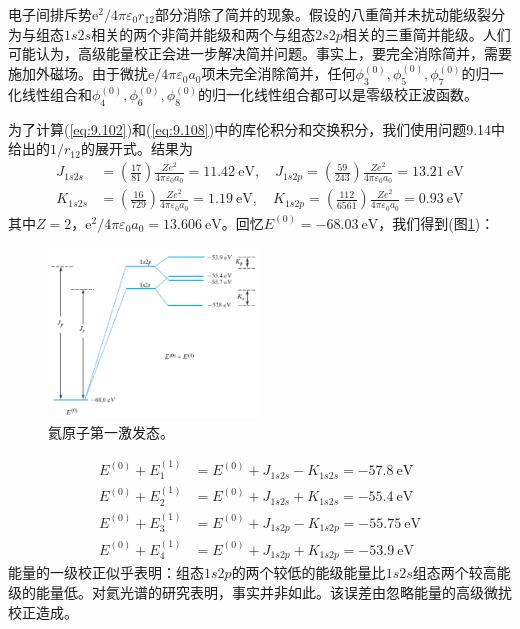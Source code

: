     电子间排斥势$\mathrm{e}^2/4\pi\varepsilon_0 r_{12}$部分消除了简并的现象。假设的八重简并未扰动能级裂分为与组态$1s2s$相关的两个非简并能级和两个与组态$2s2p$相关的三重简并能级。人们可能认为，高级能量校正会进一步解决简并问题。事实上，要完全消除简并，需要施加外磁场。由于微扰$\mathrm{e}/4\pi\varepsilon_0a_0$项未完全消除简并，任何$\phi_3^{\left(0\right)},\phi_5^{\left(0\right)},\phi_7^{\left(0\right)}$的归一化线性组合和$\phi_4^{\left(0\right)},\phi_6^{\left(0\right)},\phi_8^{\left(0\right)}$的归一化线性组合都可以是零级校正波函数。

    为了计算(\ref{eq:9.102})和(\ref{eq:9.108})中的库伦积分和交换积分，我们使用问题9.14中给出的$1/r_{12}$的展开式。结果为
    \begin{equation}
        \begin{aligned}
            J_{1s2s} &= \left( \frac{17}{81} \right) \frac{Ze^2}{4\pi \varepsilon_0 a_0} = 11.42 \:\mathrm{eV}, \quad J_{1s2p} = \left( \frac{59}{243} \right) \frac{Ze^2}{4\pi \varepsilon_0 a_0} = 13.21 \:\mathrm{eV} \\
            K_{1s2s} &= \left(\frac{16}{729}\right) \frac{Ze^2}{4\pi \varepsilon_0 a_0} = 1.19 \:\mathrm{eV}, \quad K_{1s2p} = \left(\frac{112}{6561}\right) \frac{Ze^2}{4\pi \varepsilon_0 a_0} = 0.93\:\mathrm{eV}
        \end{aligned}
        \label{eq:9.111}
    \end{equation}
    其中$Z=2$，$\mathrm{e}^2/4\pi\varepsilon_0 a_0 = 13.606 \:\mathrm{eV}$。回忆$E^{\left(0\right)} = -68.03 \:\mathrm{eV}$，我们得到(图\ref{fig:9.3})：
    \begin{figure}[ht]
        \centering
        \includegraphics[width=0.5\textwidth]{Figures/9.3.png}
        \caption{氦原子第一激发态。}
        \label{fig:9.3}
    \end{figure}
    \begin{equation*}
        \begin{aligned}
            E^{(0)} + E_1^{(1)} &= E^{(0)} + J_{1s2s} - K_{1s2s} = -57.8 \:\mathrm{eV} \\
            E^{(0)} + E_2^{(1)} &= E^{(0)} + J_{1s2s} + K_{1s2s} = -55.4 \:\mathrm{eV} \\
            E^{(0)} + E_3^{(1)} &= E^{(0)} + J_{1s2p} - K_{1s2p} = -55.75 \:\mathrm{eV} \\
            E^{(0)} + E_4^{(1)} &= E^{(0)} + J_{1s2p} + K_{1s2p} = -53.9 \:\mathrm{eV}
        \end{aligned}
    \end{equation*}
    能量的一级校正似乎表明：组态$1s2p$的两个较低的能级能量比$1s2s$组态两个较高能级的能量低。对氦光谱的研究表明，事实并非如此。该误差由忽略能量的高级微扰校正造成。

